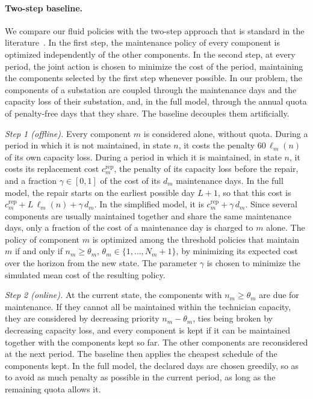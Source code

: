 \documentclass{article}
\begin{document}
\paragraph{Two-step baseline.} We compare our fluid policies with the two-step approach that is standard in the
literature~\cite{Kingsman2020, Mankowska2014}. In the first step, the maintenance policy of every component is
optimized independently of the other components. In the second step, at every period, the joint action is chosen to
minimize the cost of the period, maintaining the components selected by the first step whenever possible. In our
problem, the components of a substation are coupled through the maintenance days and the capacity loss of their
substation, and, in the full model, through the annual quota of penalty-free days that they share. The baseline
decouples them artificially.

\emph{Step 1 (offline).} Every component $m$ is considered alone, without quota. During a period in which it is not
maintained, in state $n$, it costs the penalty $60\,\ell_m(n)$ of its own capacity loss. During a period in which it is
maintained, in state $n$, it costs its replacement cost $c^{\mathrm{rep}}_m$, the penalty of its capacity loss before the
repair, and a fraction $\gamma \in [0,1]$ of the cost of its $d_m$ maintenance days. In the full model, the repair
starts on the earliest possible day $L+1$, so that this cost is $c^{\mathrm{rep}}_m + L\,\ell_m(n) + \gamma\, d_m$. In the
simplified model, it is $c^{\mathrm{rep}}_m + \gamma\, d_m$. Since several components are usually maintained together and
share the same maintenance days, only a fraction of the cost of a maintenance day is charged to $m$ alone. The policy
of component $m$ is optimized among the threshold policies that maintain $m$ if and only if $n_m \ge \theta_m$,
$\theta_m \in \{1,\ldots,N_m+1\}$, by minimizing its expected cost over the horizon from the new state. The parameter
$\gamma$ is chosen to minimize the simulated mean cost of the resulting policy.

\emph{Step 2 (online).} At the current state, the components with $n_m \ge \theta_m$ are due for maintenance. If they
cannot all be maintained within the technician capacity, they are considered by decreasing priority $n_m - \theta_m$,
ties being broken by decreasing capacity loss, and every component is kept if it can be maintained together with the
components kept so far. The other components are reconsidered at the next period. The baseline then applies the
cheapest schedule of the components kept. In the full model, the declared days are chosen greedily, so as to
avoid as much penalty as possible in the current period, as long as the remaining quota allows it.
\end{document}
